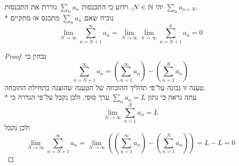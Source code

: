\Question{}
יהי $N \in \mathbb{N}$, וידוע כי התכנסות $\sum_n a_n$ גוררת את התכנסות $\sum_n a_{n + N}$. \\*
נוכיח שאם $\sum_n a_n$ מתכנס אז מתקיים
\[
	\lim_{N \to \infty} \sum_{n = N + 1}^{\infty} a_n = \lim_{N \to \infty} \lim_{k \to \infty} \sum_{n = N + 1}^{k} a_n = 0
\]
\begin{proof}
	נבחין כי
	\[
		\sum_{n = N + 1}^\infty a_n = \left(\sum_{n = 1}^{\infty} a_n\right) - \left( \sum_{n = 1}^{N} a_n \right)
	\]
	טענה זו נכונה על־פי תהליך ההוכחה של הטענה שהוצגה בתחילת ההוכחה. \\*
	עתה נראה כי נתון $\sum_n a_n = L$ ערך סופי, ולכן נקבל על־פי הגדרה כי
	\[
		\lim_{N \to \infty} \sum_{n = 1}^{N} a_n = L
	\]
	ולכן נקבל
	\[
		\lim_{N \to \infty} \sum_{n = N + 1}^\infty a_n
		= \lim_{N \to \infty} \left( \left(\sum_{n = 1}^{\infty} a_n\right) - \left( \sum_{n = 1}^{N} a_n \right) \right)
		= L - L
		= 0
	\]
\end{proof}

